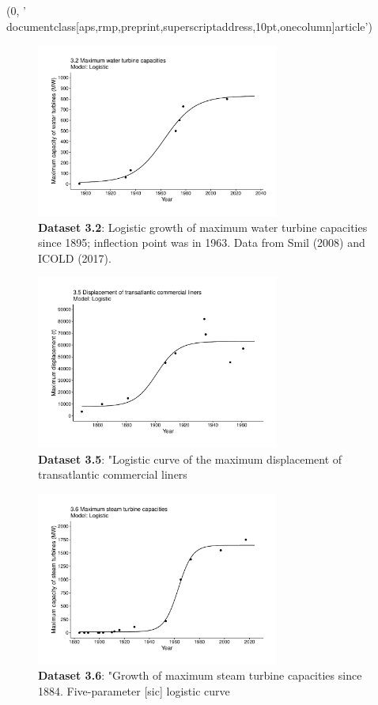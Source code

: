 (0, '\\documentclass[aps,rmp,preprint,superscriptaddress,10pt,onecolumn]{article}\n')
\begin{document}
\begin{figure}[h]
\includegraphics[width=8cm]{output/figs-ggplot/3.2.pdf}
\caption{\textbf{Dataset 3.2}: Logistic growth of maximum water turbine capacities since 1895; inflection point was in 1963. Data from Smil (2008) and ICOLD (2017).}
\end{figure}
	
\begin{figure}[h]
\includegraphics[width=8cm]{output/figs-ggplot/3.5.pdf}
\caption{\textbf{Dataset 3.5}: "Logistic curve of the maximum displacement of transatlantic commercial liners}
\end{figure}
	
\begin{figure}[h]
\includegraphics[width=8cm]{output/figs-ggplot/3.6.pdf}
\caption{\textbf{Dataset 3.6}: "Growth of maximum steam turbine capacities since 1884. Five-parameter [sic] logistic curve}
\end{figure}
	
\end{document}
